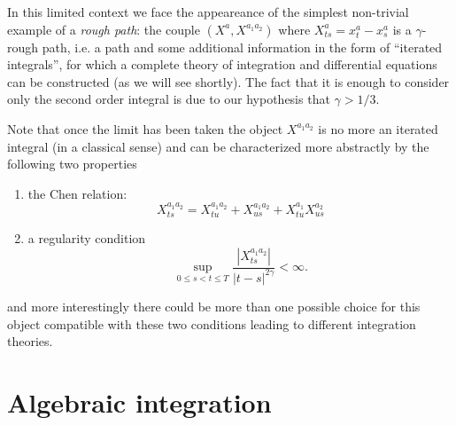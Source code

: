 \documentclass[a4paper]{article}
\newcommand{\1}{{\bf 1}}
\begin{document}
In this limited context we face the appeareance of the simplest
non-trivial example of a \emph{rough path}: the couple $(X^a,X^{a_1
  a_2})$ where $X^a_{ts} = x^a_t - x^a_s$ is a
$\gamma$-rough path, i.e. a path and some additional information in
the form of ``iterated integrals'', for which a complete theory
of integration and differential equations can be constructed (as we
will see shortly). The fact that it is enough to
consider only the second order integral is due to our hypothesis that
$\gamma > 1/3$.



Note that once the limit has been taken the object $X^{a_1
  a_2}$ is no more an iterated integral (in a classical
sense) and can be characterized more abstractly by the following two
properties
\begin{enumerate}
\item
 the Chen relation:
 \begin{equation}
   \label{eq:chen-step-two}
X^{a_1
  a_2}_{ts} = X^{a_1
  a_2}_{tu} + X^{a_1
  a_2}_{us} + X^{a_1}_{tu} X^{ a_2}_{us}   
 \end{equation}
\item a regularity condition
 \begin{equation}
   \label{eq:reg-step-two}
\sup_{0 \le s < t \le T}\frac{|X^{a_1
    a_2}_{ts}|}{|t-s|^{2\gamma}}  < \infty.
 \end{equation}
\end{enumerate}
and more interestingly there could be  more than one
possible choice for this object compatible with these two conditions  leading to different integration
theories.

\section{Algebraic integration}
\label{sec:algint}
\end{document}
